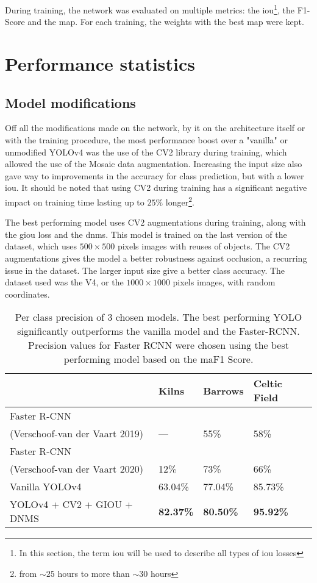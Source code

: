 During training, the network was evaluated on multiple metrics: the \gls{iou}\footnote{In this section, the term \gls{iou} will be used to describe all types of \gls{iou} losses}, the F1-Score and the \gls{map}. For each training, the weights with the best \gls{map} were kept.  

\section{Performance statistics}
\subsection{Model modifications}
Off all the modifications made on the network, by it on the architecture itself or with the training procedure, the most performance boost over a "vanilla" or unmodified YOLOv4 was the use of the CV2 library during training, which allowed the use of the Mosaic data augmentation. Increasing the input size also gave way to improvements in the accuracy for class prediction, but with a lower \gls{iou}. It should be noted that using CV2 during training has a significant negative impact on training time lasting up to $25\%$ longer\footnote{from $\sim 25$ hours to more than $\sim 30$ hours}. 

The best performing model uses CV2 augmentations during training, along with the \gls{giou} loss and the \gls{dnms}. This model is trained on the last version of the dataset, which uses $500 \times 500$ pixels images with reuses of objects. The CV2 augmentations gives the model a better robustness against occlusion, a recurring issue in the dataset. The larger input size give a better class accuracy. The dataset used was the V4, or the $1000 \times 1000$ pixels images, with random coordinates.  


\begin{table}[h]
	\centering
	\begin{tabular}{@{}llll@{}}
		\toprule
			      & Kilns           & Barrows         & Celtic Field    \\ \midrule
			      Faster R-CNN\\ (Verschoof-van der Vaart 2019) \cite{wouter2019}& ---             & 55\%             & 58\%             \\
			      Faster R-CNN\\ (Verschoof-van der Vaart 2020) \cite{wouter2020}& 12\% & 73\%             & 66\%             \\
			      Vanilla YOLOv4                & 63.04\%          & 77.04\%          & 85.73\%          \\
			      YOLOv4 + CV2 + GIOU + DNMS    & \textbf{82.37\%} & \textbf{80.50\%} & \textbf{95.92\%} \\ \bottomrule
	\end{tabular}
			      \caption{Per class precision of 3 chosen models. The best performing YOLO significantly outperforms the vanilla model and the Faster-RCNN. Precision values for Faster RCNN were chosen using the best performing model based on the maF1 Score.}
			      \label{tab:resClasses}
\end{table}

